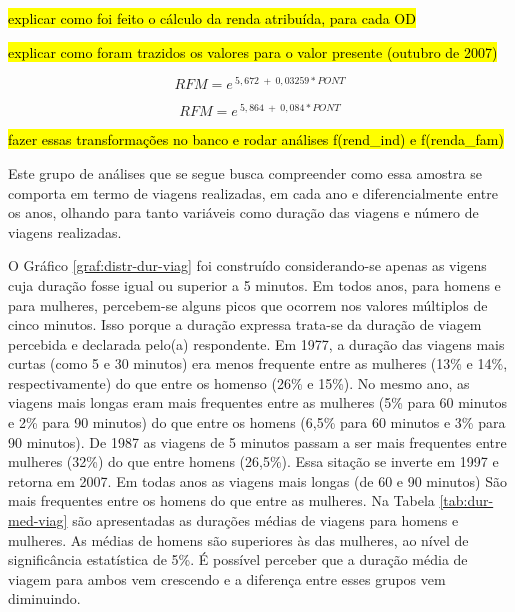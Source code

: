 \hl{explicar como foi feito o cálculo da renda atribuída, para cada OD}

\hl{explicar como foram trazidos os valores para o valor presente (outubro de 2007)}

\begin{equation}\label{eq:reg-renda-1997}
RFM = e^{~5,672~+~0,03259*PONT}
\end{equation}

\begin{equation}\label{eq:reg-renda-2007}
RFM = e^{~5,864~+~0,084*PONT}
\end{equation}

\hl{fazer essas transformações no banco e rodar análises f(rend\_ind) e f(renda\_fam)}

\clearpage
Este grupo de análises que se segue busca compreender como essa amostra se comporta em termo de viagens realizadas, em cada ano e diferencialmente entre os anos, olhando para tanto variáveis como duração das viagens e número de viagens realizadas.


O Gráfico \ref{graf:distr-dur-viag} foi construído considerando-se apenas as vigens cuja duração fosse igual ou superior a 5 minutos. Em todos anos, para homens e para mulheres, percebem-se alguns picos que ocorrem nos valores múltiplos de cinco minutos. Isso porque a duração expressa trata-se da duração de viagem percebida e declarada pelo(a) respondente. Em 1977, a duração das viagens mais curtas (como 5 e 30 minutos) era menos frequente entre as mulheres (13\% e 14\%, respectivamente) do que entre os homenso (26\% e 15\%). No mesmo ano, as viagens mais longas eram mais frequentes entre as mulheres (5\% para 60 minutos e 2\% para 90 minutos) do que entre os homens (6,5\% para 60 minutos e 3\% para 90 minutos). De 1987 as viagens de 5 minutos passam a ser mais frequentes entre mulheres (32\%) do que entre homens (26,5\%). Essa sitação se inverte em 1997 e retorna em 2007.
Em todas anos as viagens mais longas (de 60 e 90 minutos) São mais frequentes entre os homens do que entre as mulheres.
Na Tabela \ref{tab:dur-med-viag} são apresentadas as durações médias de viagens para homens e mulheres. As médias de homens são superiores às das mulheres, ao nível de significância estatística de 5\%. É possível perceber que a duração média de viagem para ambos vem crescendo e a diferença entre esses grupos vem diminuindo.


